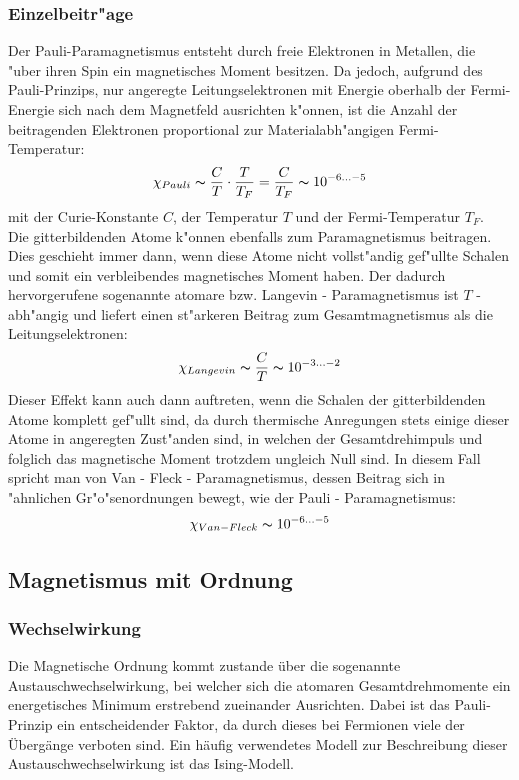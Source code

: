             \subsubsection*{Einzelbeitr"age}
            Der Pauli-Paramagnetismus entsteht durch freie Elektronen in Metallen, die "uber ihren Spin
            ein magnetisches Moment besitzen. Da jedoch, aufgrund des Pauli-Prinzips, nur angeregte
            Leitungselektronen mit Energie oberhalb der Fermi-Energie sich nach dem Magnetfeld ausrichten k"onnen,
            ist die Anzahl der beitragenden Elektronen proportional zur Materialabh"angigen Fermi-Temperatur:
            \begin{equation}
                \chi_{Pauli} \thicksim \frac{C}{T} \cdot \frac{T}{T_{F}} = \frac{C}{T_F}\thicksim 10^{-6 ... -5}
            \end{equation}
            mit der Curie-Konstante $C$, der Temperatur $T$ und der Fermi-Temperatur $T_F$.
            \\
            Die gitterbildenden Atome k"onnen ebenfalls zum Paramagnetismus beitragen. Dies geschieht immer dann, wenn diese Atome nicht vollst"andig gef"ullte Schalen und somit ein verbleibendes magnetisches Moment haben. Der dadurch hervorgerufene sogenannte atomare bzw. Langevin - Paramagnetismus ist $T$ - abh"angig und liefert einen st"arkeren Beitrag zum Gesamtmagnetismus als die Leitungselektronen:
            \begin{equation}
            	\chi_{Langevin} \thicksim \frac{C}{T} \thicksim 10^{-3 ... -2}
            \end{equation}
			Dieser Effekt kann auch dann auftreten, wenn die Schalen der gitterbildenden Atome komplett gef"ullt sind, da durch thermische Anregungen stets einige dieser Atome in angeregten Zust"anden sind, in welchen der Gesamtdrehimpuls und folglich das magnetische Moment trotzdem ungleich Null sind. In diesem Fall spricht man von Van - Fleck - Paramagnetismus, dessen Beitrag sich in "ahnlichen Gr"o"senordnungen bewegt, wie der Pauli - Paramagnetismus:
			\begin{equation}
				\chi_{Van - Fleck} \thicksim 10^{-6 ... -5}
			\end{equation}
			


    \subsection{Magnetismus mit Ordnung}
        \subsubsection*{Wechselwirkung}
            Die Magnetische Ordnung kommt zustande über die sogenannte Austauschwechselwirkung, bei welcher sich
            die atomaren Gesamtdrehmomente ein energetisches Minimum erstrebend zueinander Ausrichten. Dabei ist
            das Pauli-Prinzip ein entscheidender Faktor, da durch dieses bei Fermionen viele der Übergänge verboten sind.
            Ein häufig verwendetes Modell zur Beschreibung dieser Austauschwechselwirkung ist das Ising-Modell.
